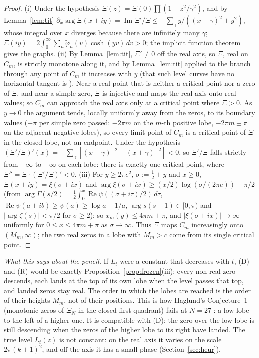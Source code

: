 \documentclass[11pt]{article}
\theoremstyle{plain}
\theoremstyle{definition}
\theoremstyle{remark}
\newcommand{\re}{\operatorname{Re}}
\newcommand{\im}{\operatorname{Im}}
\newcommand{\tphi}{\widetilde{\varphi}}
\begin{document}
\begin{proof}
(i) Under the hypothesis $\Xi(z) = \Xi(0)\prod(1 - z^2/\gamma^2)$, and by
Lemma~\ref{lem:tit}
$\partial_x\arg\Xi(x + iy) = \im\Xi'/\Xi \le -\sum_\gamma y/((x - \gamma)^2 + y^2)$,
whose integral over $x$ diverges because there are infinitely many $\gamma$;
$\Xi(iy) = 2\int_0^\infty\sum_n\tphi_n(v)\cosh(yv)\,dv > 0$; the implicit
function theorem gives the graphs.
(ii) By Lemma~\ref{lem:tit}, $\Xi' \ne 0$ off the real axis, so $\Xi$, real
on $C_m$, is strictly monotone along it, and by Lemma~\ref{lem:tit} applied to
the branch through any point of $C_m$ it increases with $y$ (that such level
curves have no horizontal tangent is \cite[(3.3)--(3.4)]{CS}). Near a real point that is
neither a critical point nor a zero of $\Xi$, and near a simple zero, $\Xi$ is
injective and maps the real axis onto real values; so $C_m$ can approach the
real axis only at a critical point where $\Xi > 0$. As $y \to 0$ the argument
tends, locally uniformly away from the zeros, to its boundary values ($-\pi$ per
simple zero passed: $-2\pi m$ on the $m$-th positive lobe, $-2\pi m \pm \pi$
on the adjacent negative lobes), so every limit point of $C_m$ is a critical
point of $\Xi$ in the closed lobe, not an endpoint. Under the hypothesis
$(\Xi'/\Xi)'(x) = -\sum_\gamma[(x - \gamma)^{-2} + (x + \gamma)^{-2}] < 0$,
so $\Xi'/\Xi$ falls strictly from $+\infty$ to $-\infty$ on each lobe: there
is exactly one critical point, where $\Xi'' = \Xi\cdot(\Xi'/\Xi)' < 0$.
(iii) For $y \ge 2\pi e^2$, $\sigma := \frac12 + y$ and $x \ge 0$,
$\Xi(x + iy) = \overline{\xi(\sigma + ix)}$ and
$\arg\xi(\sigma + ix) \ge (x/2)\log(\sigma/(2\pi e)) - \pi/2$ (from
$\arg\Gamma(s/2) = \frac12\int_0^x \re\psi((\sigma + i\tau)/2)\,d\tau$,
$\re\psi(a + ib) \ge \psi(a) \ge \log a - 1/a$, $\arg s(s-1) \in [0,\pi)$
and $|\arg\zeta(s)| < \pi/2$ for $\sigma \ge 2$); so
$x_m(y) \le 4\pi m + \pi$, and $|\xi(\sigma + ix)| \to \infty$ uniformly
for $0 \le x \le 4\pi m + \pi$ as $\sigma \to \infty$. Thus $\Xi$ maps
$C_m$ increasingly onto $(M_m, \infty)$; the two real zeros in a lobe with
$M_m > c$ come from its single critical point.
\end{proof}

\emph{What this says about the pencil.} If $L_t$ were a constant that
decreases with $t$, (D) and (R) would be exactly
Proposition~\ref{prop:frozen}(iii): every non-real zero descends, each lands at
the top of its own lobe when the level passes that top, and landed zeros stay
real. The order in which the lobes are reached is the order of their heights
$M_m$, not of their positions. This is how Haglund's Conjecture~1
\cite[p.~3]{Hag} (monotonic zeros of $\Xi_N$ in the closed first quadrant)
fails at $N = 27$ \cite{Tya}: a low lobe to the left of a higher one. It is compatible
with (D): the zero over the low lobe is still descending when
the zeros of the higher lobe to its right have landed. The true level $L_t(z)$
is not constant: on the real axis it varies on the scale $2\pi(k+1)^2$, and off
the axis it has a small phase (Section~\ref{sec:heur}).
\end{document}
